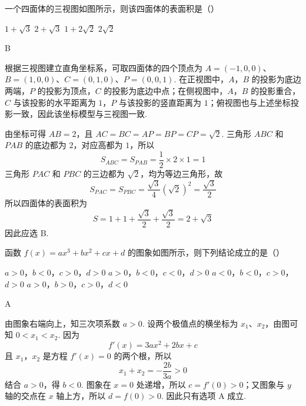 \begin{problem}
一个四面体的三视图如图所示，则该四面体的表面积是（\quad）


\choices
    {\(1 + \sqrt{3}\)}
    {\(2 + \sqrt{3}\)}
    {\(1 + 2\sqrt{2}\)}
    {\(2\sqrt{2}\)}

\begin{answer}
B
\end{answer}

\begin{solution}
根据三视图建立直角坐标系，可取四面体的四个顶点为
\(A=(-1,0,0)\)、\(B=(1,0,0)\)、\(C=(0,1,0)\)、\(P=(0,0,1)\).
在正视图中，\(A\)，\(B\) 的投影为底边两端，\(P\) 的投影为顶点，\(C\) 的投影为底边中点；在侧视图中，\(A\)，\(B\) 的投影重合，\(C\) 与该投影的水平距离为 \(1\)，\(P\) 与该投影的竖直距离为 \(1\)；俯视图也与上述坐标投影一致，因此该坐标模型与三视图一致.

由坐标可得 \(AB=2\)，且 \(AC=BC=AP=BP=CP=\sqrt2\). 三角形 \(ABC\) 和 \(PAB\) 的底边都为 \(2\)，对应高都为 \(1\)，所以
\[
S_{ABC}=S_{PAB}=\frac12\times2\times1=1
\]
三角形 \(PAC\) 和 \(PBC\) 的三边都为 \(\sqrt2\)，均为等边三角形，故
\[
S_{PAC}=S_{PBC}=\frac{\sqrt3}{4}(\sqrt2)^2=\frac{\sqrt3}{2}
\]
所以四面体的表面积为
\[
S=1+1+\frac{\sqrt3}{2}+\frac{\sqrt3}{2}=2+\sqrt3
\]
因此应选 B.
\end{solution}
\end{problem}

\begin{problem}
函数 \( f(x) = ax^3 + bx^2 + cx + d \) 的图象如图所示，则下列结论成立的是（\quad）


\choices
    {\(a > 0\)，\(b < 0\)，\(c > 0\)，\(d > 0\)}
    {\(a > 0\)，\(b < 0\)，\(c < 0\)，\(d > 0\)}
    {\(a < 0\)，\(b < 0\)，\(c > 0\)，\(d > 0\)}
    {\(a > 0\)，\(b > 0\)，\(c > 0\)，\(d < 0\)}

\begin{answer}
A
\end{answer}

\begin{solution}
由图象右端向上，知三次项系数 \(a>0\). 设两个极值点的横坐标为 \(x_1\)、\(x_2\)，由图可知 \(0<x_1<x_2\). 因为
\[
f'(x)=3ax^2+2bx+c
\]
且 \(x_1\)，\(x_2\) 是方程 \(f'(x)=0\) 的两个根，所以
\[
x_1+x_2=-\frac{2b}{3a}>0
\]
结合 \(a>0\)，得 \(b<0\). 图象在 \(x=0\) 处递增，所以 \(c=f'(0)>0\)；又图象与 \(y\) 轴的交点在 \(x\) 轴上方，所以 \(d=f(0)>0\). 因此只有选项 A 成立.
\end{solution}
\end{problem}

